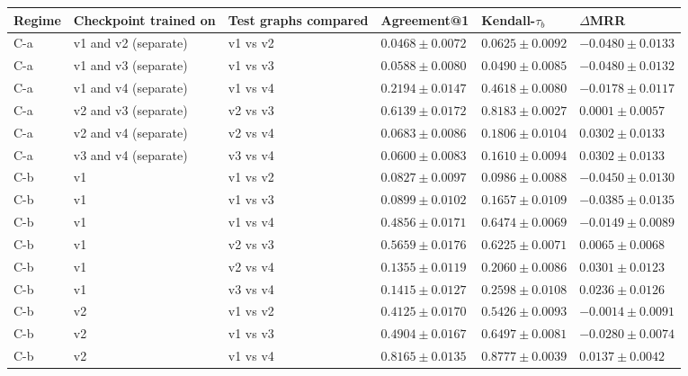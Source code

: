 \begin{table}[htbp]
\centering
\small
\renewcommand{\arraystretch}{1.15}
\setlength{\tabcolsep}{5pt}
\begin{adjustbox}{max width=\linewidth}
\begin{tabular}{|l|l|l|l|l|l|}
\hline
\textbf{Regime} & \textbf{Checkpoint trained on} & \textbf{Test graphs compared} & \textbf{Agreement@1} & \textbf{Kendall-$\tau_b$} & \textbf{$\Delta$MRR} \\
\hline
C-a & v1 and v2 (separate) & v1 vs v2 & $0.0468 \pm 0.0072$ & $0.0625 \pm 0.0092$ & $-0.0480 \pm 0.0133$ \\
\hline
C-a & v1 and v3 (separate) & v1 vs v3 & $0.0588 \pm 0.0080$ & $0.0490 \pm 0.0085$ & $-0.0480 \pm 0.0132$ \\
\hline
C-a & v1 and v4 (separate) & v1 vs v4 & $0.2194 \pm 0.0147$ & $0.4618 \pm 0.0080$ & $-0.0178 \pm 0.0117$ \\
\hline
C-a & v2 and v3 (separate) & v2 vs v3 & $0.6139 \pm 0.0172$ & $0.8183 \pm 0.0027$ & $0.0001 \pm 0.0057$ \\
\hline
C-a & v2 and v4 (separate) & v2 vs v4 & $0.0683 \pm 0.0086$ & $0.1806 \pm 0.0104$ & $0.0302 \pm 0.0133$ \\
\hline
C-a & v3 and v4 (separate) & v3 vs v4 & $0.0600 \pm 0.0083$ & $0.1610 \pm 0.0094$ & $0.0302 \pm 0.0133$ \\
\hline
C-b & v1 & v1 vs v2 & $0.0827 \pm 0.0097$ & $0.0986 \pm 0.0088$ & $-0.0450 \pm 0.0130$ \\
\hline
C-b & v1 & v1 vs v3 & $0.0899 \pm 0.0102$ & $0.1657 \pm 0.0109$ & $-0.0385 \pm 0.0135$ \\
\hline
C-b & v1 & v1 vs v4 & $0.4856 \pm 0.0171$ & $0.6474 \pm 0.0069$ & $-0.0149 \pm 0.0089$ \\
\hline
C-b & v1 & v2 vs v3 & $0.5659 \pm 0.0176$ & $0.6225 \pm 0.0071$ & $0.0065 \pm 0.0068$ \\
\hline
C-b & v1 & v2 vs v4 & $0.1355 \pm 0.0119$ & $0.2060 \pm 0.0086$ & $0.0301 \pm 0.0123$ \\
\hline
C-b & v1 & v3 vs v4 & $0.1415 \pm 0.0127$ & $0.2598 \pm 0.0108$ & $0.0236 \pm 0.0126$ \\
\hline
C-b & v2 & v1 vs v2 & $0.4125 \pm 0.0170$ & $0.5426 \pm 0.0093$ & $-0.0014 \pm 0.0091$ \\
\hline
C-b & v2 & v1 vs v3 & $0.4904 \pm 0.0167$ & $0.6497 \pm 0.0081$ & $-0.0280 \pm 0.0074$ \\
\hline
C-b & v2 & v1 vs v4 & $0.8165 \pm 0.0135$ & $0.8777 \pm 0.0039$ & $0.0137 \pm 0.0042$ \\

\end{tabular}
\end{adjustbox}
\end{table}
